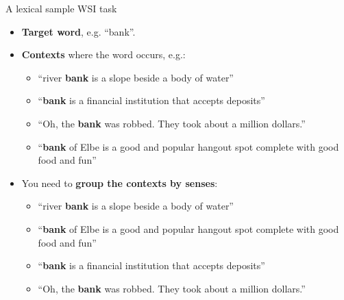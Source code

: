\begin{frame}{A lexical sample WSI task}
  
  \begin{itemize}
  	\item \textbf{Target word}, e.g. ``bank''.
  	
  	\pause 
  	
  	\item \textbf{Contexts} where the word occurs, e.g.: 
  	\begin{itemize}
  	\item ``river \textbf{bank} is a slope beside a body of water''
  	\item ``\textbf{bank} is a financial institution that accepts deposits''
  	\item ``Oh, the \textbf{bank} was robbed. They took about a million dollars.''
  	\item ``\textbf{bank} of Elbe is a good and popular hangout spot complete with good food and fun''
  	\end{itemize}
  	
  	\pause 
  	
  	\item You need to \textbf{{group} the contexts by senses}:
  	\begin{itemize}
  	\item \textcolor{Cerulean}{``river \textbf{bank} is a slope beside a body of water''}
  	\item \textcolor{Cerulean}{``\textbf{bank} of Elbe is a good and popular hangout spot complete with good food and fun''}
  	\item \alert{``\textbf{bank} is a financial institution that accepts deposits''}
  	\item \alert{``Oh, the \textbf{bank} was robbed. They took about a million dollars.''}
  	\end{itemize}
  	 
  \end{itemize}
  
\end{frame}
%
%
%
%
%
%
%
%
